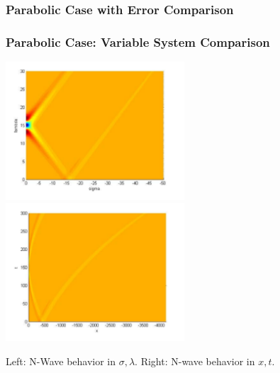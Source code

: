 	\begin{frame}
		\frametitle{Parabolic Case with Error Comparison}
		\begin{center}
		\end{center}
	\end{frame}

	\begin{frame}
		\frametitle{Parabolic Case: Variable System Comparison}
		\begin{center}
		\includegraphics[width=0.5\textwidth]{NonPhys.pdf}
		\includegraphics[width=0.5\textwidth]{Phys.pdf}
		\end{center}
		Left: N-Wave behavior in $\sigma, \lambda$.  Right: N-wave behavior in $x, t$.
		
		
	\end{frame}


